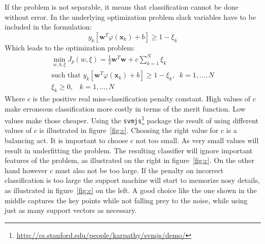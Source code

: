 If the problem is not separable, it means that classification cannot be done without error. In the underlying optimization problem slack variables have to be included in the formulation:
\begin{equation}
y_k [\mathbf{w}^T \varphi(\mathbf{x}_k) + b] \geq 1 - \xi_k
\end{equation}
Which leads to the optimization problem:
\begin{align}
\min_{w,b,\xi} J_p(w,\xi) = \frac{1}{2}\mathbf{w}^T\mathbf{w} + c \sum_{k = 1}^N \xi_k \\
\text{such that }   y_k [\mathbf{w}^T \varphi(\mathbf{x}_k) + b] \geq 1 - \xi_k, \;\; k = 1,\dots,N \\
\xi_k \geq 0, \;\;\; k = 1,\dots,N 
\end{align}
Where $c$ is the positive real miss-classification penalty constant. High values of $c$ make erroneous classification more costly in terms of the merit function.  Low values make those cheaper. Using the \texttt{svmjs}\footnote{\url{http://cs.stanford.edu/people/karpathy/svmjs/demo/}} package the result of using different values of $c$ is illustrated in figure~\ref{fig:c}. Choosing the right value for $c$ is a balancing act. It is important to choose $c$ not too small. As very small values will result in underfitting the problem. The resulting classifier will ignore important features of the problem, as illustrated on the right in figure~\ref{fig:c}. On the other hand however $c$ must also not be too large. If the penalty on incorrect classification is too large the support machine will start to memorize nosy details, as illustrated in figure~\ref{fig:c} on the left. A good choice like the one shown in the middle captures the key points while not falling prey to the noise, while using just as many support vectors as necessary. 
